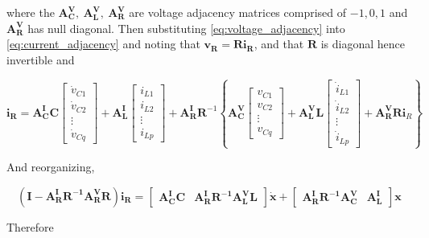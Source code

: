 	\noindent where the $\mathbf{A^V_C},\ \mathbf{A^V_L},\ \mathbf{A^V_R}$ are voltage adjacency matrices comprised of $-1,0,1$ and $\mathbf{A^V_R}$ has null diagonal. Then substituting \eqref{eq:voltage_adjacency} into \eqref{eq:current_adjacency} and noting that $\mathbf{v_R} = \mathbf{Ri_R}$, and that $\mathbf{R}$ is diagonal hence invertible and

\begin{equation}
	\mathbf{i_R} = \mathbf{A^I_C}\mathbf{C} \left[\begin{array}{c} \dot{v}_{C1} \\[3mm] \dot{v}_{C2} \\[3mm] \vdots \\[3mm] \dot{v}_{Cq} \end{array}\right]  + \mathbf{A^I_L} \left[\begin{array}{c} i_{L1} \\[3mm] i_{L2} \\[3mm] \vdots \\[3mm] i_{Lp} \end{array}\right] + \mathbf{A^I_R}\mathbf{R}^{-1}\left\{\mathbf{A^V_C} \left[\begin{array}{c} v_{C1} \\[3mm] v_{C2} \\[3mm] \vdots \\[3mm] v_{Cq} \end{array}\right]  + \mathbf{A^V_L}\mathbf{L} \left[\begin{array}{c} \dot{i}_{L1} \\[3mm] \dot{i}_{L2} \\[3mm] \vdots \\[3mm] \dot{i}_{Lp} \end{array}\right] + \mathbf{A^V_R}\mathbf{R}\mathbf{i}_R \right\}
\end{equation}

	And reorganizing,

\begin{equation}
	\left(\mathbf{I} - \mathbf{A^I_RR^{-1}A^V_RR}\right)\mathbf{i_R} = \left[\begin{array}{cc} \mathbf{A^I_CC} & \mathbf{A^I_RR^{-1}A^V_LL} \end{array}\right]\dot{\mathbf{x}} + \left[\begin{array}{cc} \mathbf{A^I_RR^{-1}A^V_C} & \mathbf{A^I_L} \end{array}\right]\mathbf{x}
\end{equation}

	Therefore 

